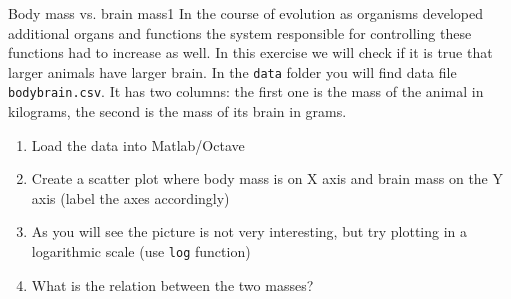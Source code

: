 \documentclass[a4paper,11pt]{article}
\begin{document}
%
%
\begin{exercise}{2}{Body mass vs. brain mass}{1}
In the course of evolution as organisms developed additional organs and functions the system responsible for controlling these functions had to increase as well. In this exercise we will check if it is true that larger animals have larger brain. In the \texttt{data} folder you will find data file \texttt{bodybrain.csv}. It has two columns: the first one is the mass of the animal in kilograms, the second is the mass of its brain in grams.
\begin{enumerate}
	\item Load the data into Matlab/Octave
	\item Create a scatter plot where body mass is on X axis and brain mass on the Y axis (label the axes accordingly)
	\item As you will see the picture is not very interesting, but try plotting in a logarithmic scale (use \texttt{log} function)
	\item What is the relation between the two masses?
\end{enumerate}
\end{exercise}
\end{document}
